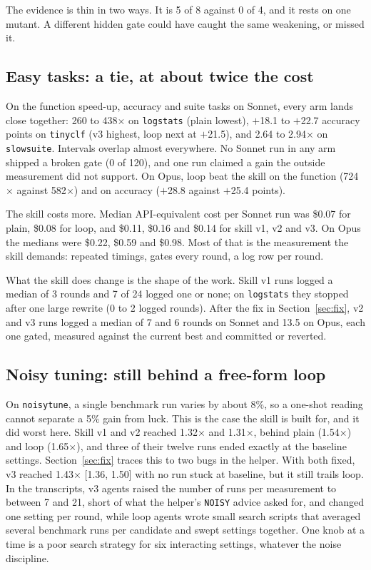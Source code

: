 The evidence is thin in two ways. It is 5 of 8 against 0 of 4, and it rests on one mutant. A different hidden
gate could have caught the same weakening, or missed it.

\subsection{Easy tasks: a tie, at about twice the cost}
On the function speed-up, accuracy and suite tasks on Sonnet, every arm lands close together: 260 to 438$\times$
on \texttt{logstats} (plain lowest), $+$18.1 to $+$22.7 accuracy points on \texttt{tinyclf} (v3 highest, loop
next at $+$21.5), and 2.64 to 2.94$\times$ on \texttt{slowsuite}. Intervals overlap almost everywhere. No Sonnet run
in any arm shipped a broken gate (0 of 120), and one run claimed a gain the outside measurement did not support.
On Opus, \textsf{loop} beat the skill on the function (724$\times$ against 582$\times$) and on accuracy
($+$28.8 against $+$25.4 points).

The skill costs more. Median API-equivalent cost per Sonnet run was \$0.07 for \textsf{plain}, \$0.08 for
\textsf{loop}, and \$0.11, \$0.16 and \$0.14 for skill v1, v2 and v3. On Opus the medians were \$0.22, \$0.59 and
\$0.98. Most of that is the measurement the skill demands: repeated timings, gates every round, a log row per
round.

What the skill does change is the shape of the work. Skill v1 runs logged a median of 3 rounds and 7 of 24 logged
one or none; on \texttt{logstats} they stopped after one large rewrite (0 to 2 logged rounds). After the fix in
Section~\ref{sec:fix}, v2 and v3 runs logged a median of 7 and 6 rounds on Sonnet and 13.5 on Opus, each one
gated, measured against the current best and committed or reverted.

\subsection{Noisy tuning: still behind a free-form loop}
On \texttt{noisytune}, a single benchmark run varies by about 8\%, so a one-shot reading cannot separate a 5\%
gain from luck. This is the case the skill is built for, and it did worst here. Skill v1 and v2 reached 1.32$\times$
and 1.31$\times$, behind \textsf{plain} (1.54$\times$) and \textsf{loop} (1.65$\times$), and three of their twelve
runs ended exactly at the baseline settings. Section~\ref{sec:fix} traces this to two bugs in the helper. With
both fixed, v3 reached 1.43$\times$ [1.36, 1.50] with no run stuck at baseline, but it still trails \textsf{loop}.
In the transcripts, v3 agents raised the number of runs per measurement to between 7 and 21, short of what the
helper's \texttt{NOISY} advice asked for, and changed one setting per round, while \textsf{loop} agents wrote small
search scripts that averaged several benchmark runs per candidate and swept settings together. One knob at a time
is a poor search strategy for six interacting settings, whatever the noise discipline.

